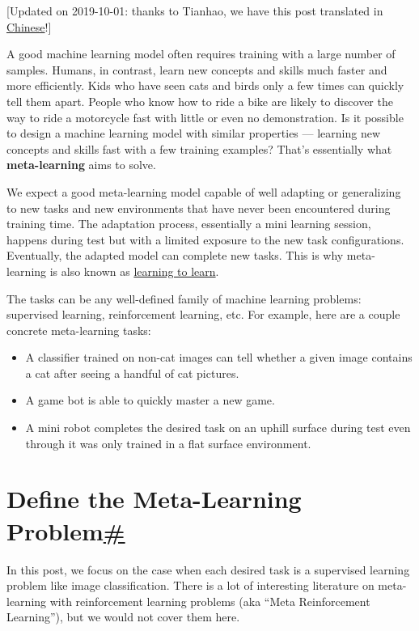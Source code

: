 {{[}Updated on 2019-10-01: thanks to Tianhao, we have this post translated in \href{https://wei-tianhao.github.io/blog/2019/09/17/meta-learning.html}{Chinese}!{]}}

A good machine learning model often requires training with a large number of samples. Humans, in contrast, learn new concepts and skills much faster and more efficiently. Kids who have seen cats and birds only a few times can quickly tell them apart. People who know how to ride a bike are likely to discover the way to ride a motorcycle fast with little or even no demonstration. Is it possible to design a machine learning model with similar properties --- learning new concepts and skills fast with a few training examples? That's essentially what \textbf{meta-learning} aims to solve.

We expect a good meta-learning model capable of well adapting or generalizing to new tasks and new environments that have never been encountered during training time. The adaptation process, essentially a mini learning session, happens during test but with a limited exposure to the new task configurations. Eventually, the adapted model can complete new tasks. This is why meta-learning is also known as \href{https://www.cs.cmu.edu/~rsalakhu/papers/LakeEtAl2015Science.pdf}{learning to learn}.

The tasks can be any well-defined family of machine learning problems: supervised learning, reinforcement learning, etc. For example, here are a couple concrete meta-learning tasks:

\begin{itemize}
\tightlist
\item
  A classifier trained on non-cat images can tell whether a given image contains a cat after seeing a handful of cat pictures.
\item
  A game bot is able to quickly master a new game.
\item
  A mini robot completes the desired task on an uphill surface during test even through it was only trained in a flat surface environment.
\end{itemize}

\section{\texorpdfstring{Define the Meta-Learning Problem\hyperref[define-the-meta-learning-problem]{\#}}{Define the Meta-Learning Problem\#}}\label{define-the-meta-learning-problem}

In this post, we focus on the case when each desired task is a supervised learning problem like image classification. There is a lot of interesting literature on meta-learning with reinforcement learning problems (aka ``Meta Reinforcement Learning''), but we would not cover them here.

